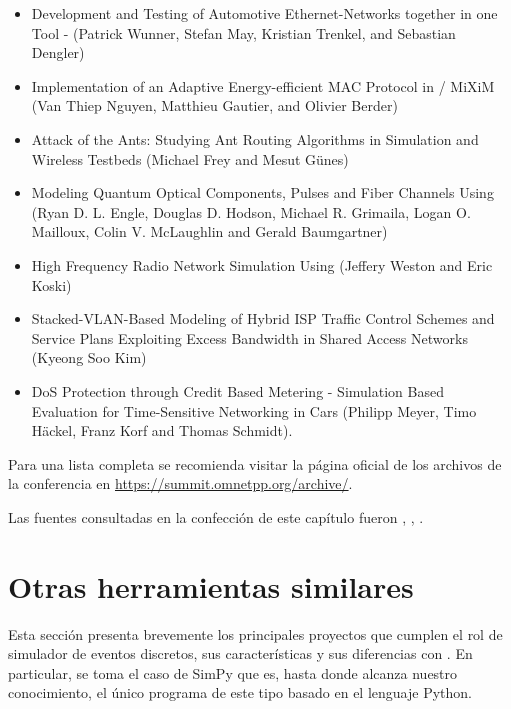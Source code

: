 \begin{itemize}
    \item Development and Testing of Automotive Ethernet-Networks together in
    one Tool - \omnetpp{} (Patrick Wunner, Stefan May, Kristian Trenkel, and
    Sebastian Dengler)

    \item Implementation of an Adaptive Energy-efficient MAC Protocol in
    \omnetpp{} / MiXiM (Van Thiep Nguyen, Matthieu Gautier, and Olivier Berder)

    \item Attack of the Ants: Studying Ant Routing Algorithms in Simulation and
    Wireless Testbeds (Michael Frey and Mesut Günes)

    \item Modeling Quantum Optical Components, Pulses and Fiber Channels Using
    \omnetpp{} (Ryan D. L. Engle, Douglas D. Hodson, Michael R. Grimaila, Logan
    O.  Mailloux, Colin V. McLaughlin and Gerald Baumgartner)

    \item High Frequency Radio Network Simulation Using \omnetpp{} (Jeffery
    Weston and Eric Koski)

    \item Stacked-VLAN-Based Modeling of Hybrid ISP Traffic Control Schemes and
    Service Plans Exploiting Excess Bandwidth in Shared Access Networks (Kyeong
    Soo Kim)

    \item DoS Protection through Credit Based Metering - Simulation Based
    Evaluation for Time-Sensitive Networking in Cars (Philipp Meyer, Timo
    Häckel, Franz Korf and Thomas Schmidt).
\end{itemize}

Para una lista completa se recomienda visitar la página oficial de los archivos
de la conferencia en \url{https://summit.omnetpp.org/archive/}.

Las fuentes consultadas en la confección de este capítulo fueron \cite{varga1},
\cite{varga2}, \cite{opp_manual}.

\section{Otras herramientas similares}

Esta sección presenta brevemente los principales proyectos que cumplen el rol
de simulador de eventos discretos, sus características y sus diferencias con
\omnetpp{}. En particular, se toma el caso de SimPy que es, hasta donde alcanza
nuestro conocimiento, el único programa de este tipo basado en el lenguaje
Python.

